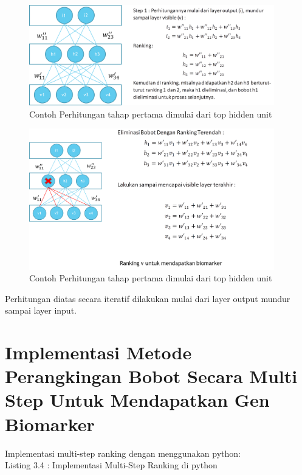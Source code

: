 \begin{figure}
	\centering
	\includegraphics[width=0.95\textwidth]
		{pics/multistep2.png}
	\caption{Contoh Perhitungan tahap pertama dimulai dari top hidden unit }
	\label{fig:multistep2}
\end{figure}

\begin{figure}
	\centering
	\includegraphics[width=0.95\textwidth]
		{pics/multistep3.png}
	\caption{Contoh Perhitungan tahap pertama dimulai dari top hidden unit }
	\label{fig:multistep3}
\end{figure}

Perhitungan diatas secara iteratif dilakukan mulai dari layer output mundur sampai layer input.

\section{Implementasi Metode Perangkingan Bobot Secara Multi Step Untuk Mendapatkan Gen Biomarker}
Implementasi multi-step ranking dengan menggunakan python:\\
Listing 3.4 : Implementasi Multi-Step Ranking di python



